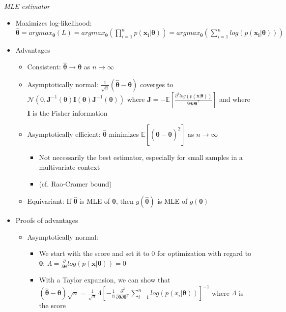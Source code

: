 \emph{MLE estimator}
\begin{itemize}
    \item Maximizes log-likelihood: $\hat{\boldsymbol{\theta}} = argmax_{\boldsymbol{\theta}}(L) = argmax_{\boldsymbol{\theta}}(\prod_{i=1}^n p(\boldsymbol{x_i} | \boldsymbol{\theta})) = argmax_{\boldsymbol{\theta}}(\sum_{i=1}^n log(p(\boldsymbol{x_i} | \boldsymbol{\theta})))$
    \item Advantages
    \begin{itemize}
        \item Consistent: $\hat{\boldsymbol{\theta}} \rightarrow \boldsymbol{\theta}$ as $n \rightarrow \infty$
        \item Asymptotically normal: $\frac{1}{\sqrt{n}} (\hat{\boldsymbol{\theta}} - \boldsymbol{\theta})$ coverges to $\mathcal{N}(0 , \boldsymbol{J}^{-1} (\boldsymbol{\theta}) \boldsymbol{I}(\boldsymbol{\theta}) \boldsymbol{J}^{-1} (\boldsymbol{\theta}) )$ where $\boldsymbol{J} = -\mathbb{E}[ \frac{ \partial^2 log( p(\boldsymbol{x} | \boldsymbol{\theta}) ) }{ \partial \boldsymbol{\theta} \partial \boldsymbol{\theta}^\intercal } ]$ and where $\boldsymbol{I}$ is the Fisher information
        \item Asymptotically efficient: $\hat{\boldsymbol{\theta}}$ minimizes $\mathbb{E} [ ( \hat{\boldsymbol{\theta}} - \boldsymbol{\theta} )^2 ]$ as $n \rightarrow \infty$ 
        \begin{itemize}
            \item Not necessarily the best estimator, especially for small samples in a multivariate context
            \item (cf. Rao-Cramer bound)
        \end{itemize}
        \item Equivariant: If $\hat{\boldsymbol{\theta}}$ is MLE of $\boldsymbol{\theta}$, then $g(\hat{\boldsymbol{\theta}})$ is MLE of $g(\boldsymbol{\theta})$
    \end{itemize}
    \item Proofs of advantages
    \begin{itemize}
        \item Asymptotically normal: 
        \begin{itemize}
            \item We start with the score and set it to 0 for optimization with regard to $\boldsymbol{\theta}$: 
            $\Lambda = \frac{\partial}{\partial \boldsymbol{\theta}} log(p( \boldsymbol{x} | \boldsymbol{\theta})) = 0$
            \item With a Taylor expansion, we can show that $( \hat{\boldsymbol{\theta}} - \boldsymbol{\theta} ) \sqrt{n} = \frac{1}{\sqrt{n}} \Lambda [ -\frac{1}{n} \frac{\partial^2}{\partial \boldsymbol{\theta} \partial \boldsymbol{\theta}^\intercal} \sum_{i=1}^n log (p( x_i | \boldsymbol{\theta})) ]^{-1}$ where $\Lambda$ is the score 

\end{itemize}
\end{itemize}
\end{itemize}
